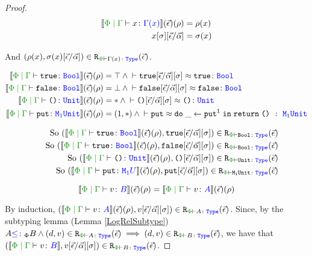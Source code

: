 \begin{proof}
        \begin{align*}
            \deno{\gpetyperelation{x}{\G(x)}}\fundRho & = \rho(x) \\
            x\ssi\ssub{\av}{\ev} & = \si(x)\\
        \end{align*}
    
        And $\inLogRelPE{\rho(x)}{\si(x)\ssub{\av}{\ev}}{\G(x)}$.
    
        \begin{align*}
            \deno{\gpetyperelation{\t}{\B}}\fundRho & = \top \wedge \zberelation{\t\fundSub}{\t}{\B} 
            \\ 
            \deno{\gpetyperelation{\f}{\B}}\fundRho & = \bot \wedge \zberelation{\f\fundSub}{\f}{\B}
            \\ 
            \deno{\gpetyperelation{\u}{\U}}\fundRho & = \singleton \wedge \zberelation{\u\fundSub}{\u}{\U}
            \\
            \deno{\gpetyperelation{\put}{\M{1}{\U}}}\fundRho & = (1, \singleton)\wedge \zberelation{\put}{\doin{\_}{\put^1}{\return{\u}}}{\s\M{\1}{\U}}
            \\
        \end{align*}
    
        \begin{align*}
            \qt{ So } \inLogRelPE{\deno{\gpetyperelation{\t}{\B}}\fundRho}{\t\fundSub}{\B}
            \\
            \qt{ So } \inLogRelPE{\deno{\gpetyperelation{\t}{\B}}\fundRho}{\f\fundSub}{\B}
            \\
            \qt{ So } \inLogRelPE{\deno{\gpetyperelation{\u}{\U}}\fundRho}{\u\fundSub}{\U}
            \\
            \qt{So }\inLogRelPE{\deno{\gpetyperelation{\put}{\M{\1}{U}}}\fundRho}{\put\fundSub}{\M{\1}{\U}}
            \\ 
        \end{align*}
    
        \case{\vsubtype}
    
        \begin{equation}
            \deno{\gpetyperelation{v}{B}}\fundRho = \deno{\gpetyperelation{v}{A}}\fundRho
        \end{equation}
    
        By induction, $\inLogRelPE{\deno{\gpetyperelation{v}{A}}\fundRho}{v\fundSub}{A}$.
        Since, by the subtyping lemma (Lemma \ref{LogRelSubtype}) $A\subtypep B \wedge \inLogRelPE{d}{v}{A} \implies \inLogRelPE{d}{v}{B}$, we have that $\inLogRelPE{\deno{\gpetyperelation{v}{B}}}{v\fundSub}{B}$.
    

\end{proof}
